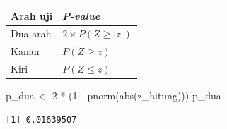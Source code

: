 \documentclass[
  indonesian,
  letterpaper,
]{book}
\newenvironment{Shaded}{\begin{snugshade}}{\end{snugshade}}
\newcommand{\DecValTok}[1]{\textcolor[rgb]{0.68,0.00,0.00}{#1}}
\newcommand{\FunctionTok}[1]{\textcolor[rgb]{0.28,0.35,0.67}{#1}}
\newcommand{\NormalTok}[1]{\textcolor[rgb]{0.00,0.23,0.31}{#1}}
\newcommand{\OtherTok}[1]{\textcolor[rgb]{0.00,0.23,0.31}{#1}}
\newcommand{\SpecialCharTok}[1]{\textcolor[rgb]{0.37,0.37,0.37}{#1}}
\newcounter{none} %
\begin{document}
{\def\LTcaptype{none} %
\begin{longtable}[]{@{}ll@{}}
\toprule\noalign{}
Arah uji & \emph{P-value} \\
\midrule\noalign{}
\endhead
\bottomrule\noalign{}
\endlastfoot
Dua arah & \(2 \times P(Z \ge \lvert z \rvert)\) \\
Kanan & \(P(Z \ge z)\) \\
Kiri & \(P(Z \le z)\) \\
\end{longtable}
}

\begin{Shaded}
\begin{Highlighting}[]
\NormalTok{p\_dua }\OtherTok{\textless{}{-}} \DecValTok{2} \SpecialCharTok{*}\NormalTok{ (}\DecValTok{1} \SpecialCharTok{{-}} \FunctionTok{pnorm}\NormalTok{(}\FunctionTok{abs}\NormalTok{(z\_hitung)))}
\NormalTok{p\_dua}
\end{Highlighting}
\end{Shaded}

\begin{verbatim}
[1] 0.01639507
\end{verbatim}
\end{document}
